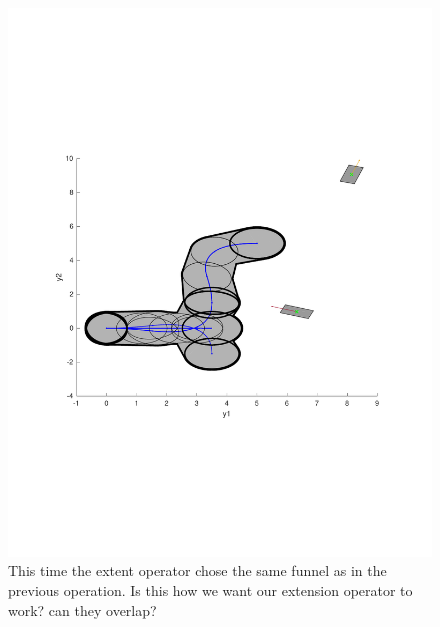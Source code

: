 \begin{figure}
  \includegraphics[scale=.5]{figures/rrtfunnel/modified-euclidean-distance-closest-funnel4}
  \caption{This time the extent operator chose the same funnel as in the
    previous operation. Is this how we want our extension operator to work? can
    they overlap?}
\end{figure}


